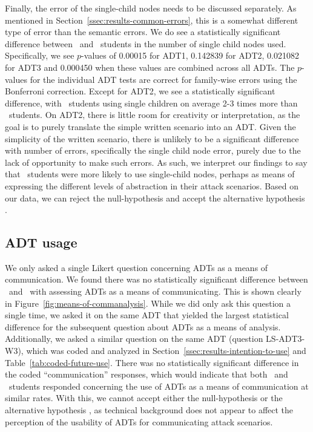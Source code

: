 Finally, the error of the single-child nodes needs to be discussed separately. As mentioned in Section~\ref{ssec:results-common-errors}, this is a somewhat different type of error than the semantic errors. We do see a statistically significant difference between \ICS\ and \SEC\ students in the number of single child nodes used. Specifically, we see $p$-values of 0.00015 for ADT1, 0.142839 for ADT2, 0.021082 for ADT3 and 0.000450 when these values are combined across all ADTs. The $p$-values for the individual ADT tests are correct for family-wise errors using the Bonferroni correction. Except for ADT2, we see a statistically significant difference, with \ICS\ students using single children on average 2-3 times more than \SEC\ students. On ADT2, there is little room for creativity or interpretation, as the goal is to purely translate the simple written scenario into an ADT. Given the simplicity of the written scenario, there is unlikely to be a significant difference with number of errors, specifically the single child node error, purely due to the lack of opportunity to make such errors. As such, we interpret our findings to say that \ICS\ students were more likely to use single-child nodes, perhaps as means of expressing the different levels of abstraction in their attack scenarios. Based on our data, we can reject the null-hypothesis \nullhypothesis{\hypoSingleChildNodes} and accept the alternative hypothesis \althypothesis{\hypoSingleChildNodes}.



\subsection{ADT usage}
\label{ssec:analysis-adt-usage}

We only asked a single Likert question concerning ADTs as a means of communication. We found there was no statistically significant difference between \ICS\ and \SEC\ with assessing ADTs as a means of communicating. This is shown clearly in Figure~\ref{fig:means-of-commanalysis}. While we did only ask this question a single time, we asked it on the same ADT that yielded the largest statistical difference for the subsequent question about ADTs as a means of analysis. 
Additionally, we asked a similar question on the same ADT (question LS-ADT3-W3), which was coded and analyzed in Section~\ref{ssec:results-intention-to-use} and Table~\ref{tab:coded-future-use}. There was no statistically significant difference in the coded ``communication'' responses, which would indicate that both \ICS\ and \SEC\ students responded concerning the use of ADTs as a means of communication at similar rates.
With this, we cannot accept either the null-hypothesis \nullhypothesis{\hypoCommunicationTool} or the alternative hypothesis \althypothesis{\hypoCommunicationTool}, as technical background does not appear to affect the perception of the usability of ADTs for communicating attack scenarios.

